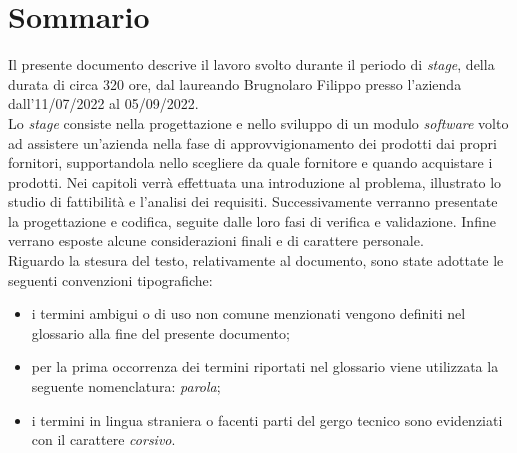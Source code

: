 
\cleardoublepage
{}
{}
\begingroup
\let\clearpage\relax
\let\cleardoublepage\relax
\let\cleardoublepage\relax

\chapter*{Sommario}

\noindent Il presente documento descrive il
lavoro svolto durante il periodo di \textit{stage},
della durata di circa 320 ore, dal laureando
Brugnolaro Filippo presso l'azienda
\textit{\myCompany} dall'11/07/2022 al
05/09/2022.\\
\noindent Lo \textit{stage} consiste nella progettazione e nello sviluppo di un modulo \textit{software} volto
ad assistere un'azienda nella fase di approvvigionamento dei prodotti dai propri fornitori, supportandola nello scegliere
da quale fornitore e quando acquistare i prodotti.
Nei capitoli verrà effettuata una introduzione al problema, illustrato lo studio di fattibilità e l'analisi dei requisiti.
Successivamente verranno presentate la progettazione e codifica, seguite dalle loro fasi di verifica e validazione.
Infine verrano esposte alcune considerazioni finali e di carattere personale.\\

\noindent Riguardo la stesura del testo, relativamente al documento, sono state adottate le seguenti convenzioni tipografiche:
\begin{itemize}
	\item i termini ambigui o di uso non comune menzionati vengono definiti nel glossario alla fine del presente documento;
	\item per la prima occorrenza dei termini riportati nel glossario viene utilizzata la seguente nomenclatura: \emph{parola}\glsfirstoccur;
	\item i termini in lingua straniera o facenti parti del gergo tecnico sono evidenziati con il carattere \emph{corsivo}.
\end{itemize}

%
%

\endgroup			

\vfill

